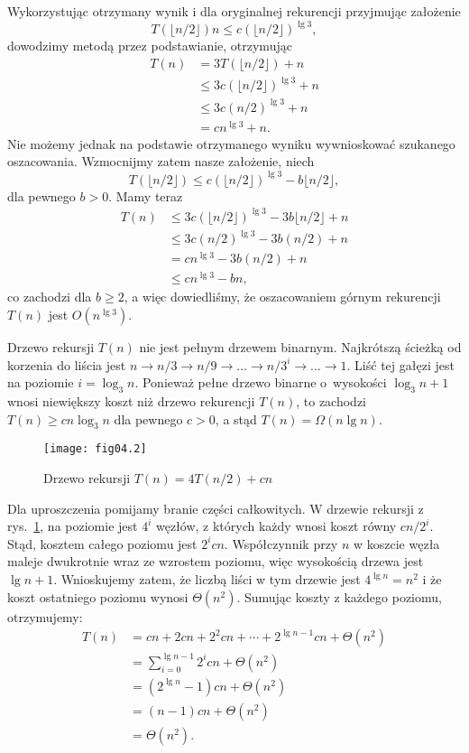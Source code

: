 Wykorzystując otrzymany wynik i dla oryginalnej rekurencji przyjmując założenie
\[
	T(\lfloor n/2\rfloor)n\le c(\lfloor n/2\rfloor)^{\lg 3},
\]
dowodzimy metodą przez podstawianie, otrzymując
\begin{align*}
	T(n) &= 3T(\lfloor n/2\rfloor)+n \\
	&\le 3c(\lfloor n/2\rfloor)^{\lg 3}+n \\
	&\le 3c(n/2)^{\lg 3}+n \\
	&= cn^{\lg 3}+n.
\end{align*}
Nie możemy jednak na podstawie otrzymanego wyniku wywnioskować szukanego oszacowania. Wzmocnijmy zatem nasze założenie, niech
\[
	T(\lfloor n/2\rfloor) \le c(\lfloor n/2\rfloor)^{\lg 3}-b\lfloor n/2\rfloor,
\]
dla pewnego $b>0$. Mamy teraz
\begin{align*}
	T(n) &\le 3c(\lfloor n/2\rfloor)^{\lg 3}-3b\lfloor n/2\rfloor+n \\
	&\le 3c(n/2)^{\lg 3}-3b(n/2)+n \\
	&= cn^{\lg 3}-3b(n/2)+n \\
	&\le cn^{\lg 3}-bn,
\end{align*}
co zachodzi dla $b\ge2$, a więc dowiedliśmy, że oszacowaniem górnym rekurencji $T(n)$ jest $O(n^{\lg3})$.

\exercise %
Drzewo rekursji $T(n)$ nie jest pełnym drzewem binarnym. Najkrótszą ścieżką od korzenia do liścia jest $n\to n/3\to n/9\to\dots\to n/3^i\to\dots\to1$. Liść tej gałęzi jest na poziomie $i=\log_3n$. Ponieważ pełne drzewo binarne o~wysokości $\log_3n+1$ wnosi niewiększy koszt niż drzewo rekurencji $T(n)$, to zachodzi $T(n)\ge cn\log_3n$ dla pewnego $c>0$, a stąd $T(n)=\Omega(n\lg n)$.

\exercise %
\begin{figure}[ht]
	\begin{center}
		\texttt{[image: fig04.2]}
	\end{center}
	\caption{Drzewo rekursji $T(n)=4T(n/2)+cn$} \label{fig:4.2-3}
\end{figure}

Dla uproszczenia pomijamy branie części całkowitych. W drzewie rekursji z rys.~\ref{fig:4.2-3}, na  poziomie jest $4^i$ węzłów, z których każdy wnosi koszt równy $cn/2^i$. Stąd, kosztem całego poziomu jest $2^icn$. Współczynnik przy $n$ w koszcie węzła maleje dwukrotnie wraz ze wzrostem poziomu, więc wysokością drzewa jest $\lg n+1$. Wnioskujemy zatem, że liczbą liści w tym drzewie jest $4^{\lg n}=n^2$ i że koszt ostatniego poziomu wynosi $\Theta(n^2)$. Sumując koszty z każdego poziomu, otrzymujemy:
\begin{align*}
	T(n) &= cn+2cn+2^2cn+\cdots+2^{\lg n-1}cn+\Theta(n^2) \\
	&= \sum_{i=0}^{\lg n-1}2^icn+\Theta(n^2) \\
	&= (2^{\lg n}-1)cn+\Theta(n^2) \\
	&= (n-1)cn+\Theta(n^2) \\
	&= \Theta(n^2).
\end{align*}

